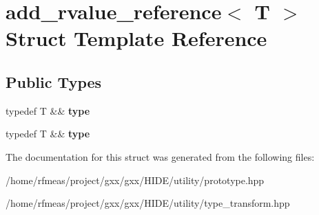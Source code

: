 \hypertarget{structadd__rvalue__reference}{}\section{add\+\_\+rvalue\+\_\+reference$<$ T $>$ Struct Template Reference}
\label{structadd__rvalue__reference}
\subsection*{Public Types}
\begin{DoxyCompactItemize}
\item 
typedef T \&\& {\bfseries type}\hypertarget{structadd__rvalue__reference_a6402006763327dc071ef0809cdc1a6e1}{}\label{structadd__rvalue__reference_a6402006763327dc071ef0809cdc1a6e1}

\item 
typedef T \&\& {\bfseries type}\hypertarget{structadd__rvalue__reference_a6402006763327dc071ef0809cdc1a6e1}{}\label{structadd__rvalue__reference_a6402006763327dc071ef0809cdc1a6e1}

\end{DoxyCompactItemize}


The documentation for this struct was generated from the following files\+:\begin{DoxyCompactItemize}
\item 
/home/rfmeas/project/gxx/gxx/\+H\+I\+D\+E/utility/prototype.\+hpp\item 
/home/rfmeas/project/gxx/gxx/\+H\+I\+D\+E/utility/type\+\_\+transform.\+hpp\end{DoxyCompactItemize}
